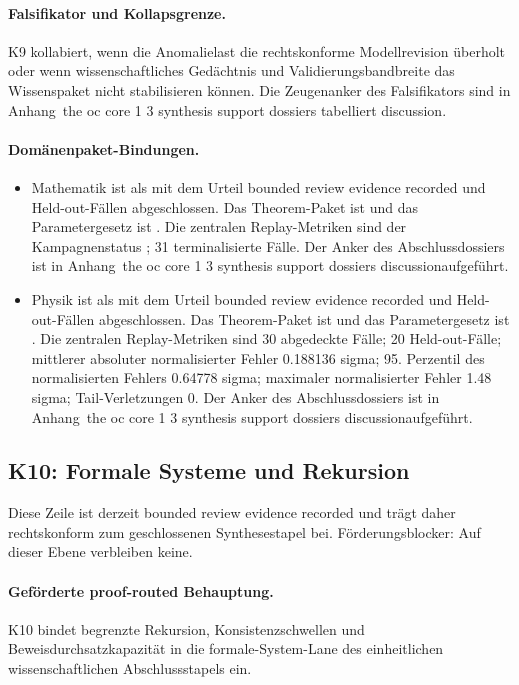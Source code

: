 \paragraph{Falsifikator und Kollapsgrenze.}
K9 kollabiert, wenn die Anomalielast die rechtskonforme Modellrevision überholt oder wenn wissenschaftliches Gedächtnis und Validierungsbandbreite das Wissenspaket nicht stabilisieren können.
Die Zeugenanker des Falsifikators sind in Anhang~the oc core 1 3 synthesis support dossiers tabelliert discussion.

\paragraph{Domänenpaket-Bindungen.}
\begin{itemize}[leftmargin=1.6em,nosep]
\item Mathematik ist als  mit dem Urteil bounded review evidence recorded und  Held-out-Fällen abgeschlossen. Das Theorem-Paket ist  und das Parametergesetz ist . Die zentralen Replay-Metriken sind der Kampagnenstatus ; 31 terminalisierte Fälle. Der Anker des Abschlussdossiers ist in Anhang~the oc core 1 3 synthesis support dossiers discussionaufgeführt.
\item Physik ist als  mit dem Urteil bounded review evidence recorded und  Held-out-Fällen abgeschlossen. Das Theorem-Paket ist  und das Parametergesetz ist . Die zentralen Replay-Metriken sind 30 abgedeckte Fälle; 20 Held-out-Fälle; mittlerer absoluter normalisierter Fehler 0.188136 sigma; 95. Perzentil des normalisierten Fehlers 0.64778 sigma; maximaler normalisierter Fehler 1.48 sigma; Tail-Verletzungen 0. Der Anker des Abschlussdossiers ist in Anhang~the oc core 1 3 synthesis support dossiers discussionaufgeführt.
\end{itemize}

\subsection{K10: Formale Systeme und Rekursion}
\label{sec:oc-core-1-3-synthesis-k10}
Diese Zeile ist derzeit bounded review evidence recorded und trägt daher rechtskonform zum geschlossenen Synthesestapel bei.
Förderungsblocker: Auf dieser Ebene verbleiben keine.

\paragraph{Geförderte proof-routed Behauptung.}
K10 bindet begrenzte Rekursion, Konsistenzschwellen und Beweisdurchsatzkapazität in die formale-System-Lane des einheitlichen wissenschaftlichen Abschlussstapels ein.


